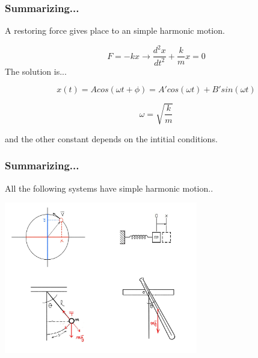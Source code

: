 \documentclass[]{beamer}
\begin{document}

\begin{frame}
\frametitle{Summarizing...}

A restoring force gives place to an simple harmonic motion.

\begin{equation*}
F=-kx\rightarrow\frac{d^2x}{dt^2}+\frac{k}{m}x=0
\end{equation*}
\pause
The solution is...
\vspace{3mm}

\pause

\begin{equation*}
x(t)=Acos(\omega t + \phi)=A'cos(\omega t)+B' sin(\omega t)
\end{equation*}

\pause

\begin{equation*}
\omega=\sqrt{\frac{k}{m}}
\end{equation*}

\pause

and the other constant depends on the intitial conditions.

\end{frame}

\begin{frame}
\frametitle{Summarizing...}

All the following systems have simple harmonic motion..


  \begin{center}
  \includegraphics[height=2.6in]{images3/summarizing2.jpg}
\end{center}


\end{frame}
\end{document}
